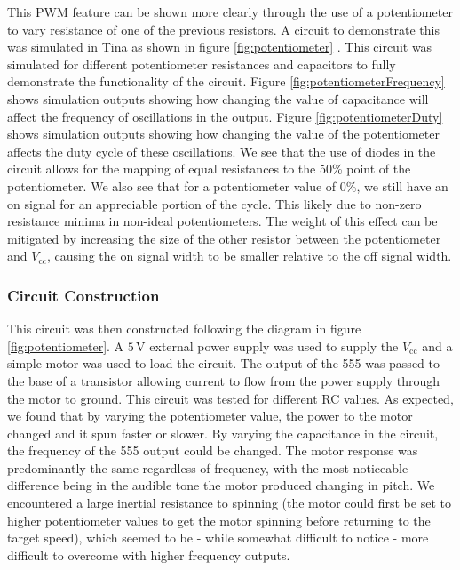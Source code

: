 \documentclass[%
 reprint,
 amsmath,amssymb,
 aps,
]{revtex4-2}
\begin{document}
        This PWM feature can be shown more clearly through the use of a potentiometer to vary resistance of one of the previous resistors. A circuit to demonstrate this was simulated in Tina as shown in figure \ref{fig:potentiometer} \cite{tina}. This circuit was simulated for different potentiometer resistances and capacitors to fully demonstrate the functionality of the circuit. Figure \ref{fig:potentiometerFrequency} shows simulation outputs showing how changing the value of capacitance will affect the frequency of oscillations in the output. Figure \ref{fig:potentiometerDuty} shows simulation outputs showing how changing the value of the potentiometer affects the duty cycle of these oscillations. We see that the use of diodes in the circuit allows for the mapping of equal resistances to the 50\% point of the potentiometer. We also see that for a potentiometer value of 0\%, we still have an on signal for an appreciable portion of the cycle. This likely due to non-zero resistance minima in non-ideal potentiometers. The weight of this effect can be mitigated by increasing the size of the other resistor between the potentiometer and $V_\text{cc}$, causing the on signal width to be smaller relative to the off signal width.


        \subsubsection{Circuit Construction}
        This circuit was then constructed following the diagram in figure \ref{fig:potentiometer}. A $5\,\text{V}$ external power supply was used to supply the $V_\text{cc}$ and a simple motor was used to load the circuit. The output of the 555 was passed to the base of a transistor allowing current to flow from the power supply through the motor to ground. This circuit was tested for different RC values. As expected, we found that by varying the potentiometer value, the power to the motor changed and it spun faster or slower. By varying the capacitance in the circuit, the frequency of the 555 output could be changed. The motor response was predominantly the same regardless of frequency, with the most noticeable difference being in the audible tone the motor produced changing in pitch. We encountered a large inertial resistance to spinning (the motor could first be set to higher potentiometer values to get the motor spinning before returning to the target speed), which seemed to be - while somewhat difficult to notice - more difficult to overcome with higher frequency outputs.
\end{document}
